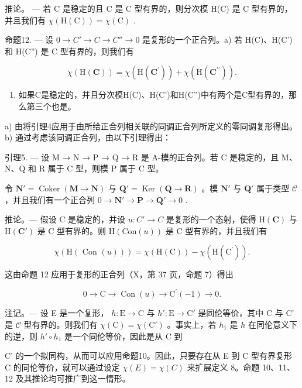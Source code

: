 推论。 --- 若 C 是稳定的且 C 是 C 型有界的，则分次模 H(C) 是 C 型有界的，并且我们有 \(\chi(\mathrm{H}(\mathrm{C})) = \chi(\mathrm{C})\) .

命题12. --- 设 \(0 \to C' \to C \to C'' \to 0\) 是复形的一个正合列。a) 若 H(C)、H(C') 和 H(C'') 是 C 型有界的，则我们有

\[
\chi (\mathrm{H} (\mathbf {C})) = \chi (\mathrm{H} (\mathbf {C} ^ {\prime})) + \chi (\mathrm{H} (\mathbf {C} ^ {\prime \prime})) .
\]

\begin{enumerate}
\def\labelenumi{\alph{enumi})}
\setcounter{enumi}{1}
\tightlist
\item
  如果C是稳定的，并且分次模H(C)、H(C')和H(C'')中有两个是C型有界的，那么第三个也是。
\end{enumerate}

a) 由将引理4应用于由所给正合列相关联的同调正合列所定义的零同调复形得出。b) 通过考虑该同调正合列，由以下引理得出：

引理5. --- 设 M → N → P → Q → R 是 A-模的正合列。若 C 是稳定的，且 M、N、Q 和 R 属于 C 型，则模 P 属于 C 型。

令 \(\mathbf{N}' = \operatorname{Coker} (\mathbf{M} \to \mathbf{N})\) 与 \(\mathbf{Q}' = \operatorname{Ker} (\mathbf{Q} \to \mathbf{R})\) 。模 \(\mathbf{N}'\) 与 \(\mathbf{Q}'\) 属于类型 \(\mathcal{C}\) ，并且我们有一个正合列 \(0 \to \mathbf{N}' \to \mathbf{P} \to \mathbf{Q}' \to 0\) .

推论。--- 假设 C 是稳定的，并设 \(u : C' \to C\) 是复形的一个态射，使得 \(\mathrm{H}(\mathbf{C})\) 与 \(\mathrm{H}(\mathbf{C}')\) 是 C 型有界的。则 \(\mathrm{H}(\mathrm{Con}(u))\) 是 C 型有界的，并且我们有

\[
\chi (\mathrm{H} (\text { Con } (u))) = \chi (\mathrm{H} (\mathrm{C})) - \chi (\mathrm{H} (\mathrm{C} ^ {\prime})) .
\]

这由命题 12 应用于复形的正合列（X，第 37 页，命题 7）得出

\[
0 \rightarrow \mathrm{C} \rightarrow \operatorname{Con} (u) \rightarrow \mathrm{C} ^ {\prime} (- 1) \rightarrow 0.
\]

注记。--- 设 E 是一个复形， \(h: \mathrm{E} \to \mathrm{C}\) 与 \(h': \mathrm{E} \to \mathrm{C}'\) 是同伦等价，其中 C 与 C' 是 \(\mathcal{C}\) 型有界的。则我们有 \(\chi(\mathrm{C}) = \chi(\mathrm{C}')\) 。事实上，若 \(h_1\) 是 \(h\) 在同伦意义下的逆，则 \(h' \circ h_1\) 是一个同伦等价，因此是从 C 到

C' 的一个拟同构，从而可以应用命题10。因此，只要存在从 E 到 C 型有界复形 C 的同伦等价，就可以通过设定 \(\chi(E) = \chi(C)\) 来扩展定义 8。命题 10、11、12 及其推论均可推广到这一情形。

